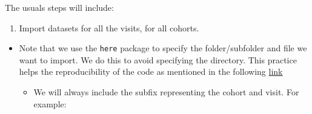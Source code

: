 \documentclass[]{book}
\providecommand{\tightlist}{%
  \setlength{\itemsep}{0pt}\setlength{\parskip}{0pt}}
\begin{document}
The usuals steps will include:

\begin{enumerate}
\def\labelenumi{\arabic{enumi}.}
\tightlist
\item
  Import datasets for all the visits, for all cohorts.
\end{enumerate}

\begin{itemize}
\item
  Note that we use the \texttt{here} package to specify the folder/subfolder and file we want to import. We do this to avoid specifying the directory. This practice helps the reproducibility of the code as mentioned in the following \href{https://www.tidyverse.org/articles/2017/12/workflow-vs-script/}{link}

  \begin{itemize}
  \tightlist
  \item
    We will always include the subfix representing the cohort and visit. For example:
  \end{itemize}
\end{itemize}
\end{document}
